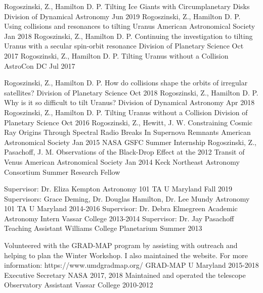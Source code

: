 \documentclass[]{awesome-cv}
\begin{document}
\begin{cventries}
	\cventry
	{Rogoszinski, Z., Hamilton D. P.}
	{Tilting Ice Giants with Circumplanetary Disks}
	{Division of Dynamical Astronomy}
	{Jun 2019}
	{}
	\cventry
	{Rogoszinski, Z., Hamilton D. P.}
	{Using collisions and resonances to tilting Uranus}
	{American Astronomical Society }
	{Jan 2018}
	{}
	\cventry
	{Rogoszinski, Z., Hamilton D. P.}
	{Continuing the investigation to tilting Uranus with a secular spin-orbit resonance}
	{Division of Planetary Science }
	{Oct 2017}
	{}
	\cventry
	{Rogoszinski, Z., Hamilton D. P.}
	{Tilting Uranus without a Collision}
	{AstroCon DC }
	{Jul 2017}
	{}	
	
	\vspace{-5mm}
\end{cventries}
\begin{cventries}
	\cventry
	{Rogoszinski, Z., Hamilton D. P.}
	{How do collisions shape the orbits of irregular satellites?}
	{Division of Planetary Science}
	{Oct 2018}
	{}
	\cventry
	{Rogoszinski, Z., Hamilton D. P.}
	{Why is it so difficult to tilt Uranus?}
	{Division of Dynamical Astronomy}
	{Apr 2018}
	{}
	\cventry
	{Rogoszinski, Z., Hamilton D. P.}
	{Tilting Uranus without a Collision}
	{Division of Planetary Science}
	{Oct 2016}
	{}
	\cventry
	{Rogoszinski, Z., Hewitt, J. W.}
	{Constraining Cosmic Ray Origins Through Spectral Radio Breaks In Supernova Remnants }
	{American Astronomical Society}
	{Jan 2015}
	{NASA GSFC Summer Internship}
	\cventry
	{Rogoszinski, Z., Pasachoff, J. M.}
	{Observations of the Black-Drop Effect at the 2012 Transit of Venus }
	{American Astronomical Society}
	{Jan 2014}
	{Keck Northeast Astronomy Consortium Summer Research Fellow}
	
	\vspace{-2mm}
\end{cventries}
\begin{cventries}
	\cventry
	{Supervisor: Dr. Eliza Kempton}
	{Astronomy 101 TA}
	{U Maryland}
	{Fall 2019}
	{}
	\cventry
	{Supervisors: Grace Deming, Dr. Douglas Hamilton, Dr. Lee Mundy}
	{Astronomy 101 TA}
	{U Maryland}
	{2014-2016}
	{}
	\cventry
	{Supervisor: Dr. Debra Elmegreen}
	{Academic Astronomy Intern}
	{Vassar College}
	{2013-2014}
	{}
	\cventry
	{Supervisor: Dr. Jay Pasachoff}
	{Teaching Assistant}
	{Williams College Planetarium}
	{Summer 2013}
	{}
	
	\vspace{-5mm}
\end{cventries}
\begin{cventries}
	\cventry
	{Volunteered with the GRAD-MAP program by assisting with outreach and helping to plan the Winter Workshop. I also maintained the website. For more information: https://www.umdgradmap.org/}
	{GRAD-MAP}
	{U Maryland}
	{2015-2018}
	{}
	\cventry
	{}
	{Executive Secretary}
	{NASA}
	{2017, 2018}
	{}
	\cventry
	{Maintained and operated the telescope}
	{Observatory Assistant}
	{Vassar College}
	{2010-2012}
	{}
	
	\vspace{-5mm}
\end{cventries}
\ 
\end{document}
